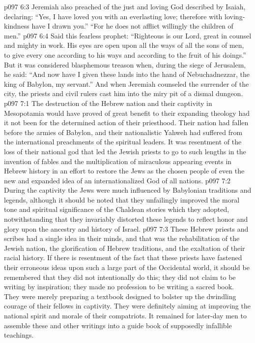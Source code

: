 \vs p097 6:3 Jeremiah also preached of the just and loving God described by Isaiah, declaring: “Yes, I have loved you with an everlasting love; therefore with loving\hyp{}kindness have I drawn you.” “For he does not afflict willingly the children of men.”
\vs p097 6:4 Said this fearless prophet: “Righteous is our Lord, great in counsel and mighty in work. His eyes are open upon all the ways of all the sons of men, to give every one according to his ways and according to the fruit of his doings.” But it was considered blasphemous treason when, during the siege of Jerusalem, he said: “And now have I given these lands into the hand of Nebuchadnezzar, the king of Babylon, my servant.” And when Jeremiah counseled the surrender of the city, the priests and civil rulers cast him into the miry pit of a dismal dungeon.
\vs p097 7:1 The destruction of the Hebrew nation and their captivity in Mesopotamia would have proved of great benefit to their expanding theology had it not been for the determined action of their priesthood. Their nation had fallen before the armies of Babylon, and their nationalistic Yahweh had suffered from the international preachments of the spiritual leaders. It was resentment of the loss of their national god that led the Jewish priests to go to such lengths in the invention of fables and the multiplication of miraculous appearing events in Hebrew history in an effort to restore the Jews as the chosen people of even the new and expanded idea of an internationalized God of all nations.
\vs p097 7:2 During the captivity the Jews were much influenced by Babylonian traditions and legends, although it should be noted that they unfailingly improved the moral tone and spiritual significance of the Chaldean stories which they adopted, notwithstanding that they invariably distorted these legends to reflect honor and glory upon the ancestry and history of Israel.
\vs p097 7:3 These Hebrew priests and scribes had a single idea in their minds, and that was the rehabilitation of the Jewish nation, the glorification of Hebrew traditions, and the exaltation of their racial history. If there is resentment of the fact that these priests have fastened their erroneous ideas upon such a large part of the Occidental world, it should be remembered that they did not intentionally do this; they did not claim to be writing by inspiration; they made no profession to be writing a sacred book. They were merely preparing a textbook designed to bolster up the dwindling courage of their fellows in captivity. They were definitely aiming at improving the national spirit and morale of their compatriots. It remained for later\hyp{}day men to assemble these and other writings into a guide book of supposedly infallible teachings.
